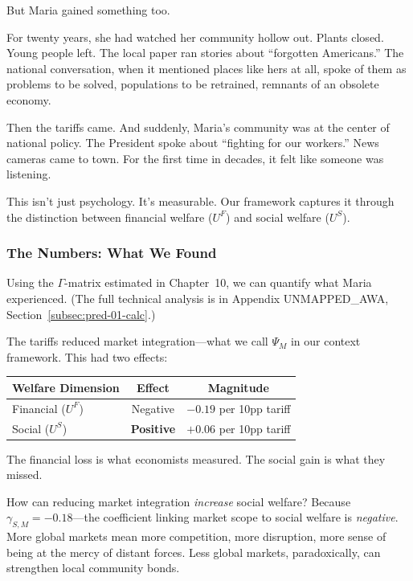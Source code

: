 But Maria gained something too.

For twenty years, she had watched her community hollow out. Plants closed. Young 
people left. The local paper ran stories about ``forgotten Americans.'' The national 
conversation, when it mentioned places like hers at all, spoke of them as problems 
to be solved, populations to be retrained, remnants of an obsolete economy.

Then the tariffs came. And suddenly, Maria's community was at the center of 
national policy. The President spoke about ``fighting for our workers.'' News 
cameras came to town. For the first time in decades, it felt like someone was 
listening.

This isn't just psychology. It's measurable. Our framework captures it through 
the distinction between financial welfare ($U^F$) and social welfare ($U^S$).

\subsubsection{The Numbers: What We Found}

Using the $\Gamma$-matrix estimated in Chapter~10, we can quantify what Maria 
experienced. (The full technical analysis is in Appendix UNMAPPED_AWA, Section~\ref{subsec:pred-01-calc}.)

The tariffs reduced market integration---what we call $\Psi_M$ in our context 
framework. This had two effects:

\begin{center}
\renewcommand{\arraystretch}{1.3}
\begin{tabular}{lcc}
\hline
\textbf{Welfare Dimension} & \textbf{Effect} & \textbf{Magnitude} \\
\hline
Financial ($U^F$) & Negative & $-0.19$ per 10pp tariff \\
Social ($U^S$) & \textbf{Positive} & $+0.06$ per 10pp tariff \\
\hline
\end{tabular}
\end{center}

The financial loss is what economists measured. The social gain is what they missed.

How can reducing market integration \emph{increase} social welfare? Because 
$\gamma_{S,M} = -0.18$---the coefficient linking market scope to social welfare 
is \emph{negative}. More global markets mean more competition, more disruption, 
more sense of being at the mercy of distant forces. Less global markets, 
paradoxically, can strengthen local community bonds.

